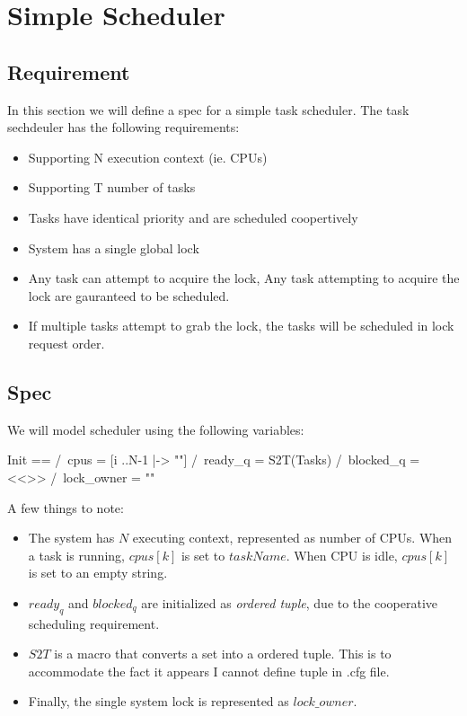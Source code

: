 \documentclass{report}
\begin{document}
\chapter{Simple Scheduler}

\section{Requirement}

In this section we will define a spec for a simple task scheduler. The task sechdeuler has the following
requirements:
\begin{itemize}
    \item Supporting N execution context (ie. CPUs)
    \item Supporting T number of tasks
    \item Tasks have identical priority and are scheduled coopertively
    \item System has a single global lock
    \item Any task can attempt to acquire the lock, Any task attempting to
    acquire the lock are gauranteed to be scheduled.
    \item If multiple tasks attempt to grab the lock, the tasks will be
    scheduled in lock request order. 
\end{itemize}

\section{Spec}

We will model scheduler using the following variables:\newline
\begin{tla}
Init ==
    /\ cpus = [i ..N-1 |-> ""] 
    /\ ready_q = S2T(Tasks)
    /\ blocked_q = <<>>
    /\ lock_owner = ""
\end{tla}
\begin{tlatex}
%
%
%
%
\end{tlatex}
\newline

A few things to note:
\begin{itemize}
    \item The system has $N$ executing context, represented as number of CPUs.
    When a task is running, $cpus[k]$ is set to $taskName$. When CPU is idle,
    $cpus[k]$ is set to an empty string. 
    \item $ready_q$ and $blocked_q$ are initialized as \textit{ordered tuple},
    due to the cooperative scheduling requirement.
    \item $S2T$ is a macro that converts a set into a ordered tuple. This is to
    accommodate the fact it appears I cannot define tuple in .cfg file.
    \item Finally, the single system lock is represented as $lock\_owner$. 
\end{itemize}
\end{document}
